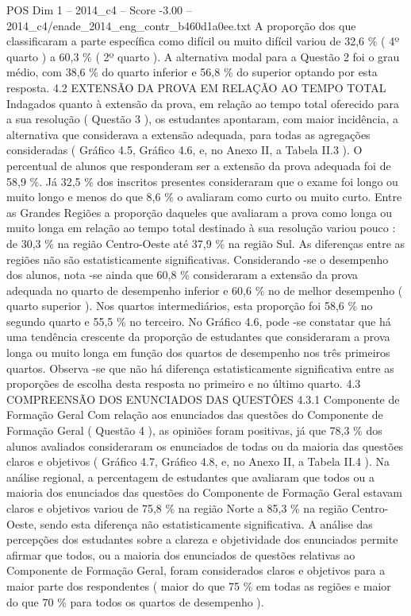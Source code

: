 \begin{textsample}{POS Dim 1 – 2014\_c4 – Score -3.00 – 2014\_c4/enade\_2014\_eng\_contr\_b460d1a0ee.txt}
A proporção dos que classificaram a parte específica como difícil ou muito difícil variou de 32,6 \% ( 4º quarto ) a 60,3 \% ( 2º quarto ).
A alternativa modal para a Questão 2 foi o grau médio, com 38,6 \% do quarto inferior e 56,8 \% do superior optando por esta resposta. 4.2 EXTENSÃO DA PROVA EM RELAÇÃO AO TEMPO TOTAL Indagados quanto à extensão da prova, em relação ao tempo total oferecido para a sua resolução ( Questão 3 ), os estudantes apontaram, com maior incidência, a alternativa que considerava a extensão adequada, para todas as agregações consideradas ( Gráfico 4.5, Gráfico 4.6, e, no Anexo II, a Tabela II.3 ).
O percentual de alunos que responderam ser a extensão da prova adequada foi de 58,9 \%.
Já 32,5 \% dos inscritos presentes consideraram que o exame foi longo ou muito longo e menos do que 8,6 \% o avaliaram como curto ou muito curto.
Entre as Grandes Regiões a proporção daqueles que avaliaram a prova como longa ou muito longa em relação ao tempo total destinado à sua resolução variou pouco : de 30,3 \% na região Centro-Oeste até 37,9 \% na região Sul.
As diferenças entre as regiões não são estatisticamente significativas.
Considerando -se o desempenho dos alunos, nota -se ainda que 60,8 \% consideraram a extensão da prova adequada no quarto de desempenho inferior e 60,6 \% no de melhor desempenho ( quarto superior ).
Nos quartos intermediários, esta proporção foi 58,6 \% no segundo quarto e 55,5 \% no terceiro.
No Gráfico 4.6, pode -se constatar que há uma tendência crescente da proporção de estudantes que consideraram a prova longa ou muito longa em função dos quartos de desempenho nos três primeiros quartos.
Observa -se que não há diferença estatisticamente significativa entre as proporções de escolha desta resposta no primeiro e no último quarto. 4.3 COMPREENSÃO DOS ENUNCIADOS DAS QUESTÕES 4.3.1 Componente de Formação Geral Com relação aos enunciados das questões do Componente de Formação Geral ( Questão 4 ), as opiniões foram positivas, já que 78,3 \% dos alunos avaliados consideraram os enunciados de todas ou da maioria das questões claros e objetivos ( Gráfico 4.7, Gráfico 4.8, e, no Anexo II, a Tabela II.4 ).
Na análise regional, a percentagem de estudantes que avaliaram que todos ou a maioria dos enunciados das questões do Componente de Formação Geral estavam claros e objetivos variou de 75,8 \% na região Norte a 85,3 \% na região Centro-Oeste, sendo esta diferença não estatisticamente significativa.
A análise das percepções dos estudantes sobre a clareza e objetividade dos enunciados permite afirmar que todos, ou a maioria dos enunciados de questões relativas ao Componente de Formação Geral, foram considerados claros e objetivos para a maior parte dos respondentes ( maior do que 75 \% em todas as regiões e maior do que 70 \% para todos os quartos de desempenho ).

\end{textsample}
